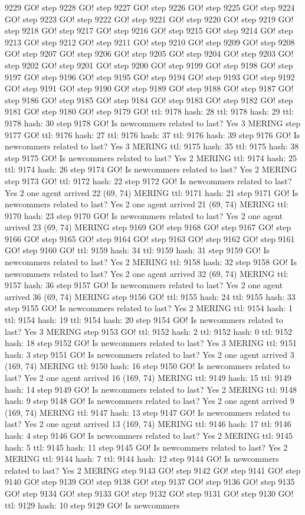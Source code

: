 9229 GO! step 9228 GO! step 9227 GO! step 9226 GO! step 9225 GO! step 9224 GO! step 9223 GO! step 9222 GO! step 9221 GO! step 9220 GO! step 9219 GO! step 9218 GO! step 9217 GO! step 9216 GO! step 9215 GO! step 9214 GO! step 9213 GO! step 9212 GO! step 9211 GO! step 9210 GO! step 9209 GO! step 9208 GO! step 9207 GO! step 9206 GO! step 9205 GO! step 9204 GO! step 9203 GO! step 9202 GO! step 9201 GO! step 9200 GO! step 9199 GO! step 9198 GO! step 9197 GO! step 9196 GO! step 9195 GO! step 9194 GO! step 9193 GO! step 9192 GO! step 9191 GO! step 9190 GO! step 9189 GO! step 9188 GO! step 9187 GO! step 9186 GO! step 9185 GO! step 9184 GO! step 9183 GO! step 9182 GO! step 9181 GO! step 9180 GO! step 9179 GO! ttl: 9178 hash: 28 ttl: 9178 hash: 29 ttl: 9178 hash: 30 step 9178 GO! Is newcommers related to last? Yes 3 MERING step 9177 GO! ttl: 9176 hash: 27 ttl: 9176 hash: 37 ttl: 9176 hash: 39 step 9176 GO! Is newcommers related to last? Yes 3 MERING ttl: 9175 hash: 35 ttl: 9175 hash: 38 step 9175 GO! Is newcommers related to last? Yes 2 MERING ttl: 9174 hash: 25 ttl: 9174 hash: 26 step 9174 GO! Is newcommers related to last? Yes 2 MERING step 9173 GO! ttl: 9172 hash: 22 step 9172 GO! Is newcommers related to last? Yes 2 one agent arrived 22 (69, 74) MERING ttl: 9171 hash: 21 step 9171 GO! Is newcommers related to last? Yes 2 one agent arrived 21 (69, 74) MERING ttl: 9170 hash: 23 step 9170 GO! Is newcommers related to last? Yes 2 one agent arrived 23 (69, 74) MERING step 9169 GO! step 9168 GO! step 9167 GO! step 9166 GO! step 9165 GO! step 9164 GO! step 9163 GO! step 9162 GO! step 9161 GO! step 9160 GO! ttl: 9159 hash: 34 ttl: 9159 hash: 31 step 9159 GO! Is newcommers related to last? Yes 2 MERING ttl: 9158 hash: 32 step 9158 GO! Is newcommers related to last? Yes 2 one agent arrived 32 (69, 74) MERING ttl: 9157 hash: 36 step 9157 GO! Is newcommers related to last? Yes 2 one agent arrived 36 (69, 74) MERING step 9156 GO! ttl: 9155 hash: 24 ttl: 9155 hash: 33 step 9155 GO! Is newcommers related to last? Yes 2 MERING ttl: 9154 hash: 1 ttl: 9154 hash: 19 ttl: 9154 hash: 20 step 9154 GO! Is newcommers related to last? Yes 3 MERING step 9153 GO! ttl: 9152 hash: 2 ttl: 9152 hash: 0 ttl: 9152 hash: 18 step 9152 GO! Is newcommers related to last? Yes 3 MERING ttl: 9151 hash: 3 step 9151 GO! Is newcommers related to last? Yes 2 one agent arrived 3 (169, 74) MERING ttl: 9150 hash: 16 step 9150 GO! Is newcommers related to last? Yes 2 one agent arrived 16 (169, 74) MERING ttl: 9149 hash: 15 ttl: 9149 hash: 14 step 9149 GO! Is newcommers related to last? Yes 2 MERING ttl: 9148 hash: 9 step 9148 GO! Is newcommers related to last? Yes 2 one agent arrived 9 (169, 74) MERING ttl: 9147 hash: 13 step 9147 GO! Is newcommers related to last? Yes 2 one agent arrived 13 (169, 74) MERING ttl: 9146 hash: 17 ttl: 9146 hash: 4 step 9146 GO! Is newcommers related to last? Yes 2 MERING ttl: 9145 hash: 5 ttl: 9145 hash: 11 step 9145 GO! Is newcommers related to last? Yes 2 MERING ttl: 9144 hash: 7 ttl: 9144 hash: 12 step 9144 GO! Is newcommers related to last? Yes 2 MERING step 9143 GO! step 9142 GO! step 9141 GO! step 9140 GO! step 9139 GO! step 9138 GO! step 9137 GO! step 9136 GO! step 9135 GO! step 9134 GO! step 9133 GO! step 9132 GO! step 9131 GO! step 9130 GO! ttl: 9129 hash: 10 step 9129 GO! Is newcommers 